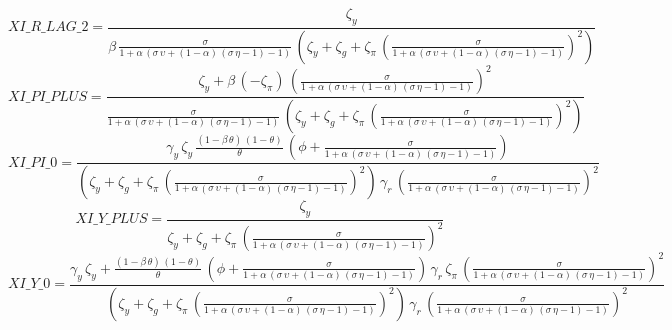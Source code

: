 \begin{dmath*}
XI\_R\_LAG\_2 = \frac{{\zeta_{y}}}{{\beta}\, \frac{{\sigma}}{1+{\alpha}\, \left({\sigma}\, {\upsilon}+\left(1-{\alpha}\right)\, \left({\sigma}\, {\eta}-1\right)-1\right)}\, \left({\zeta_{y}}+{\zeta_{g}}+{\zeta_{\pi}}\, \left(\frac{{\sigma}}{1+{\alpha}\, \left({\sigma}\, {\upsilon}+\left(1-{\alpha}\right)\, \left({\sigma}\, {\eta}-1\right)-1\right)}\right)^{2}\right)}
\end{dmath*}
\begin{dmath*}
XI\_PI\_PLUS = \frac{{\zeta_{y}}+{\beta}\, \left(-{\zeta_{\pi}}\right)\, \left(\frac{{\sigma}}{1+{\alpha}\, \left({\sigma}\, {\upsilon}+\left(1-{\alpha}\right)\, \left({\sigma}\, {\eta}-1\right)-1\right)}\right)^{2}}{\frac{{\sigma}}{1+{\alpha}\, \left({\sigma}\, {\upsilon}+\left(1-{\alpha}\right)\, \left({\sigma}\, {\eta}-1\right)-1\right)}\, \left({\zeta_{y}}+{\zeta_{g}}+{\zeta_{\pi}}\, \left(\frac{{\sigma}}{1+{\alpha}\, \left({\sigma}\, {\upsilon}+\left(1-{\alpha}\right)\, \left({\sigma}\, {\eta}-1\right)-1\right)}\right)^{2}\right)}
\end{dmath*}
\begin{dmath*}
XI\_PI\_0 = \frac{{\gamma_{y}}\, {\zeta_{y}}\, \frac{\left(1-{\beta}\, {\theta}\right)\, \left(1-{\theta}\right)}{{\theta}}\, \left({\phi}+\frac{{\sigma}}{1+{\alpha}\, \left({\sigma}\, {\upsilon}+\left(1-{\alpha}\right)\, \left({\sigma}\, {\eta}-1\right)-1\right)}\right)}{\left({\zeta_{y}}+{\zeta_{g}}+{\zeta_{\pi}}\, \left(\frac{{\sigma}}{1+{\alpha}\, \left({\sigma}\, {\upsilon}+\left(1-{\alpha}\right)\, \left({\sigma}\, {\eta}-1\right)-1\right)}\right)^{2}\right)\, {\gamma_{r}}\, \left(\frac{{\sigma}}{1+{\alpha}\, \left({\sigma}\, {\upsilon}+\left(1-{\alpha}\right)\, \left({\sigma}\, {\eta}-1\right)-1\right)}\right)^{2}}
\end{dmath*}
\begin{dmath*}
XI\_Y\_PLUS = \frac{{\zeta_{y}}}{{\zeta_{y}}+{\zeta_{g}}+{\zeta_{\pi}}\, \left(\frac{{\sigma}}{1+{\alpha}\, \left({\sigma}\, {\upsilon}+\left(1-{\alpha}\right)\, \left({\sigma}\, {\eta}-1\right)-1\right)}\right)^{2}}
\end{dmath*}
\begin{dmath*}
XI\_Y\_0 = \frac{{\gamma_{y}}\, {\zeta_{y}}+\frac{\left(1-{\beta}\, {\theta}\right)\, \left(1-{\theta}\right)}{{\theta}}\, \left({\phi}+\frac{{\sigma}}{1+{\alpha}\, \left({\sigma}\, {\upsilon}+\left(1-{\alpha}\right)\, \left({\sigma}\, {\eta}-1\right)-1\right)}\right)\, {\gamma_{r}}\, {\zeta_{\pi}}\, \left(\frac{{\sigma}}{1+{\alpha}\, \left({\sigma}\, {\upsilon}+\left(1-{\alpha}\right)\, \left({\sigma}\, {\eta}-1\right)-1\right)}\right)^{2}}{\left({\zeta_{y}}+{\zeta_{g}}+{\zeta_{\pi}}\, \left(\frac{{\sigma}}{1+{\alpha}\, \left({\sigma}\, {\upsilon}+\left(1-{\alpha}\right)\, \left({\sigma}\, {\eta}-1\right)-1\right)}\right)^{2}\right)\, {\gamma_{r}}\, \left(\frac{{\sigma}}{1+{\alpha}\, \left({\sigma}\, {\upsilon}+\left(1-{\alpha}\right)\, \left({\sigma}\, {\eta}-1\right)-1\right)}\right)^{2}}
\end{dmath*}
